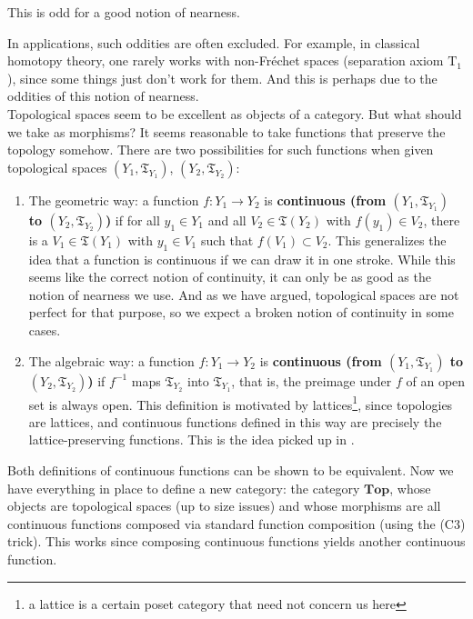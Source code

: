 \begin{exa}
\begin{enumerate}
This is odd for a good notion of nearness.
\end{enumerate}
In applications, such oddities are often excluded.
For example, in classical homotopy theory, one rarely works with non-Fr\'e{ch}et spaces (separation axiom $\textrm{T}_{1}$), since some things just don't work for them.
And this is perhaps due to the oddities of this notion of nearness.
\\
Topological spaces seem to be excellent as objects of a category.
But what should we take as morphisms?
It seems reasonable to take functions that preserve the topology somehow.
There are two possibilities for such functions when given topological spaces $(Y_{1},\mathfrak{T}_{Y_{1}})$, $(Y_{2},\mathfrak{T}_{Y_{2}})$:
\begin{enumerate}
\item[(1)]
The geometric way: a function $f \colon Y_{1} \rightarrow Y_{2}$ is \textbf{continuous (from $(Y_{1},\mathfrak{T}_{Y_{1}})$ to $(Y_{2},\mathfrak{T}_{Y_{2}})$)} if for all $y_{1} \in Y_{1}$ and all $V_{2} \in \mathfrak{T}(Y_{2})$ with $f(y_{1}) \in V_{2}$, there is a $V_{1} \in \mathfrak{T}(Y_{1})$ with $y_{1} \in V_{1}$ such that $f(V_{1}) \subset V_{2}$.
This generalizes the idea that a function is continuous if we can draw it in one stroke.
While this seems like the correct notion of continuity, it can only be as good as the notion of nearness we use.
And as we have argued, topological spaces are not perfect for that purpose, so we expect a broken notion of continuity in some cases.
\item[(2)]
The algebraic way: a function $f \colon Y_{1} \rightarrow Y_{2}$ is \textbf{continuous (from $(Y_{1},\mathfrak{T}_{Y_{1}})$ to $(Y_{2},\mathfrak{T}_{Y_{2}})$)} if $f^{-1}$ maps $\mathfrak{T}_{Y_{2}}$ into $\mathfrak{T}_{Y_{1}}$, that is, the preimage under $f$ of an open set is always open.
This definition is motivated by lattices\footnote{a lattice is a certain poset category that need not concern us here}, since topologies are lattices, and continuous functions defined in this way are precisely the lattice-preserving functions.
This is the idea picked up in \cite{797789bc}.
\end{enumerate}
Both definitions of continuous functions can be shown to be equivalent.
Now we have everything in place to define a new category: the category $\mathbf{Top}$, whose objects are topological spaces (up to size issues) and whose morphisms are all continuous functions composed via standard function composition (using the (C3) trick).
This works since composing continuous functions yields another continuous function.

\end{exa}
